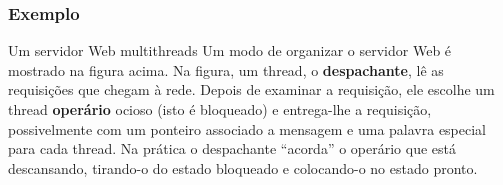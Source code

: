 \documentclass[11pt]{beamer}
\begin{document}
\begin{frame}\frametitle{ Exemplo}

\begin{block}{ Um servidor Web multithreads}
Um modo de organizar o servidor Web é mostrado na figura acima.
Na figura, um thread, o \textbf{despachante}, lê as requisições que chegam à rede. Depois de examinar a requisição, ele escolhe um thread \textbf{operário} ocioso (isto é bloqueado) e entrega-lhe a requisição, possivelmente com um ponteiro associado a mensagem e uma palavra especial para cada thread. Na prática o despachante ``acorda'' o operário que está descansando, tirando-o do estado bloqueado e colocando-o no estado pronto.
\end{block}

\end{frame}












\end{document}
